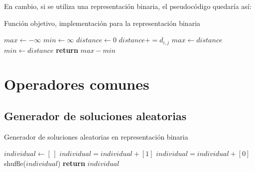 \noindent En cambio, si se utiliza una representación binaria, el pseudocódigo quedaría así:
\begin{algorithm}[H]
    \caption{Función objetivo, implementación para la representación binaria}
\begin{algorithmic}
\State $max \gets -\infty$
\State $min \gets \infty$
 
        \State $distance \gets 0$
        \State
             
                \State $distance += d_{i,j}$
            \EndIf
        \EndFor
        \State
            \State $max \gets distance$
        \EndIf
            \State $min \gets distance$
        \EndIf
    \EndIf
\EndFor
\State \textbf{return} $max - min$
\end{algorithmic}
\end{algorithm}

\section{Operadores comunes}

\subsection{Generador de soluciones aleatorias}
\begin{algorithm}[H]
    \caption{Generador de soluciones aleatorias en representación binaria}
\begin{algorithmic}
    \State $individual \leftarrow [ \, ]$
        \State $individual = individual + [1]$ 
    \EndFor
        \State $individual = individual + [0]$
    \EndFor
    \State shuffle($individual$)
    \State \textbf{return} $individual$
\EndProcedure
\end{algorithmic}
\end{algorithm}


